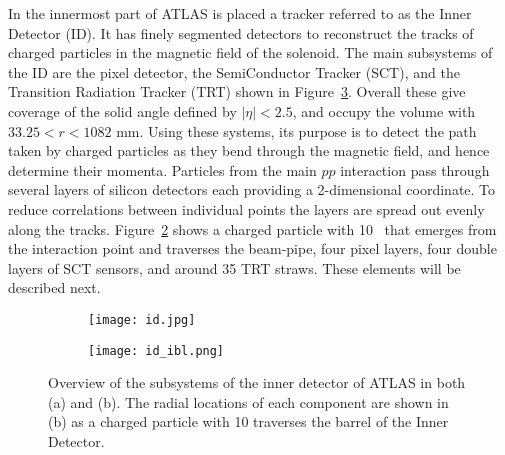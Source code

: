 In the innermost part of ATLAS is placed a tracker referred to as the Inner Detector (ID). 
It has finely segmented detectors to reconstruct the tracks of charged particles in the magnetic field of the solenoid.
The main subsystems of the ID are the pixel detector, the SemiConductor Tracker (SCT), and the Transition Radiation Tracker (TRT)
shown in Figure~\ref{fig:exp.atlas.id}.
Overall these give coverage of the solid angle defined
by $|\eta| < 2.5$, and occupy the volume with $33.25 < r < 1082$ mm. Using these systems,
its purpose is to detect the path taken by charged particles as they bend through the
magnetic field, and hence determine their momenta.
Particles from the main $pp$ interaction pass through several layers of silicon detectors each providing a 2-dimensional coordinate. 
To reduce correlations between individual points the layers are spread out evenly along the tracks.
Figure~\ref{fig:exp.atlas.id.rad} shows a charged particle with 10 \GeV~\pt that
emerges from the interaction point and traverses the beam-pipe, four pixel layers, 
four double layers of SCT sensors, and around 35 TRT straws.
These elements will be described next.

\begin{figure}[htb!]
\centering
\begin{subfigure}[t]{0.5\textwidth}
\texttt{[image: id.jpg]}
\subcaption{}
\label{fig:exp.atlas.id.all}
\end{subfigure}
\begin{subfigure}[t]{0.45\textwidth}
\texttt{[image: id\_ibl.png]}
\subcaption{}
\label{fig:exp.atlas.id.rad}
\end{subfigure}
\vspace{-0.25cm}
\caption{Overview of the subsystems of the inner detector of ATLAS in both (a) and (b).
The radial locations of each component are shown in (b) as 
 a charged particle with 10 \GeV \pt traverses the barrel of the Inner Detector.} %
\label{fig:exp.atlas.id}
\end{figure}


